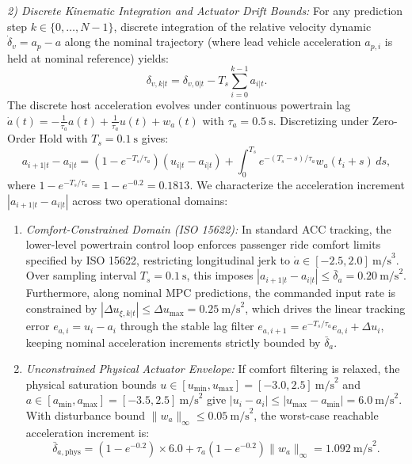 \documentclass[journal]{IEEEtran}
\begin{document}
\begin{IEEEproof}
\emph{2) Discrete Kinematic Integration and Actuator Drift Bounds:} For any prediction step $k \in \{0, \ldots, N-1\}$, discrete integration of the relative velocity dynamic $\dot\delta_v = a_p - a$ along the nominal trajectory (where lead vehicle acceleration $a_{p,i}$ is held at nominal reference) yields:
\begin{equation}
\delta_{v,k|t} = \delta_{v,0|t} - T_s \sum_{i=0}^{k-1} a_{i|t}.
\end{equation}
The discrete host acceleration evolves under continuous powertrain lag $\dot a(t) = -\frac{1}{\tau_a} a(t) + \frac{1}{\tau_a} u(t) + w_a(t)$ with $\tau_a = 0.5~\text{s}$. Discretizing under Zero-Order Hold with $T_s = 0.1~\text{s}$ gives:
\begin{equation}
a_{i+1|t} - a_{i|t} = (1 - e^{-T_s/\tau_a})(u_{i|t} - a_{i|t}) + \int_0^{T_s} e^{-(T_s - s)/\tau_a} w_a(t_i + s)\,ds,
\end{equation}
where $1 - e^{-T_s/\tau_a} = 1 - e^{-0.2} = 0.1813$. 
We characterize the acceleration increment $|a_{i+1|t} - a_{i|t}|$ across two operational domains:
\begin{enumerate}
    \item \emph{Comfort-Constrained Domain (ISO 15622):} In standard ACC tracking, the lower-level powertrain control loop enforces passenger ride comfort limits specified by ISO 15622, restricting longitudinal jerk to $\dot a \in [-2.5, 2.0]~\text{m/s}^3$. Over sampling interval $T_s = 0.1~\text{s}$, this imposes $|a_{i+1|t} - a_{i|t}| \le \bar\delta_a = 0.20~\text{m/s}^2$. Furthermore, along nominal MPC predictions, the commanded input rate is constrained by $|\Delta u_{\xi,k|t}| \le \Delta u_{\max} = 0.25~\text{m/s}^2$, which drives the linear tracking error $e_{a,i} = u_i - a_i$ through the stable lag filter $e_{a,i+1} = e^{-T_s/\tau_a} e_{a,i} + \Delta u_i$, keeping nominal acceleration increments strictly bounded by $\bar\delta_a$.
    \item \emph{Unconstrained Physical Actuator Envelope:} If comfort filtering is relaxed, the physical saturation bounds $u \in [u_{\min}, u_{\max}] = [-3.0, 2.5]~\text{m/s}^2$ and $a \in [a_{\min}, a_{\max}] = [-3.5, 2.5]~\text{m/s}^2$ give $|u_i - a_i| \le |u_{\max} - a_{\min}| = 6.0~\text{m/s}^2$. With disturbance bound $\|w_a\|_\infty \le 0.05~\text{m/s}^2$, the worst-case reachable acceleration increment is:
    \begin{equation}
    \bar\delta_{a,\mathrm{phys}} = (1 - e^{-0.2}) \times 6.0 + \tau_a(1 - e^{-0.2}) \|w_a\|_\infty = 1.092~\text{m/s}^2.
    \end{equation}

\end{enumerate}
\end{IEEEproof}
\end{document}
